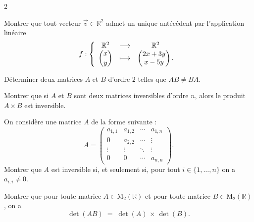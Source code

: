 \documentclass[a4paper,12pt]{article}
\begin{document}
\begin{multicols}{2}
\begin{exercice}[title=Exercice 9 $\star\star$ { [Raisonner, Communiquer] }]{}{}
  Montrer que tout vecteur $\vec{v}\in \mathbb{R}^2$ admet un unique antécédent par l’application linéaire
    \begin{equation*}
      f : \left \{
        \begin{array}{ccc}
          \mathbb{R}^2 &\longrightarrow &\mathbb{R}^2\\
          \dbinom{x}{y} &\longmapsto &
    \begin{pmatrix}
      2x + 3y \\
      x - 5y
    \end{pmatrix}.
        \end{array} \right.
      \end{equation*}
\end{exercice}

\begin{exercice}[title=Exercice 10 $\star$ { [Calculer, Chercher] }]{}{}
  Déterminer deux matrices $A$ et $B$ d’ordre 2 telles que $AB \neq BA$.
\end{exercice}

\begin{exercice}[title=Exercice 11 $\star$ { [Calculer, Raisonner] }]{}{}
  Montrer que si $A$ et $B$ sont deux matrices inversibles d’ordre $n$, alors le produit $A \times B$ est inversible.
\end{exercice}

\begin{exercice}[title=Exercice 12 $\star$ { [Raisonner, Communiquer] }]{}{}
  On considère une matrice $A$ de la forme suivante :
  \[
    A
    =
    \begin{pmatrix}
      a_{1,1} & a_{1,2} & \cdots & a_{1,n}\\
      0 & a_{2,2} & \cdots & \vdots\\
      \vdots & \vdots & \ddots & \vdots\\
      0 & 0 & \cdots & a_{n,n}
    \end{pmatrix}.
  \]
  Montrer que $A$ est inversible si, et seulement si, pour tout $i \in \{1,\ldots,n\}$ on a $a_{i,i} \neq 0$.
\end{exercice}

\begin{exercice}[title=Exercice 13 $\star\star$ { [Calculer] }]{}{}
  Montrer que pour toute matrice $A \in \mathrm{M}_{2}(\mathbb{R})$ et pour toute matrice $B \in \mathrm{M}_{2}(\mathbb{R})$, on a
  \[
    \det(AB) \;=\; \det(A)\,\times\,\det(B).
  \]
\end{exercice}


\end{multicols}
\end{document}
